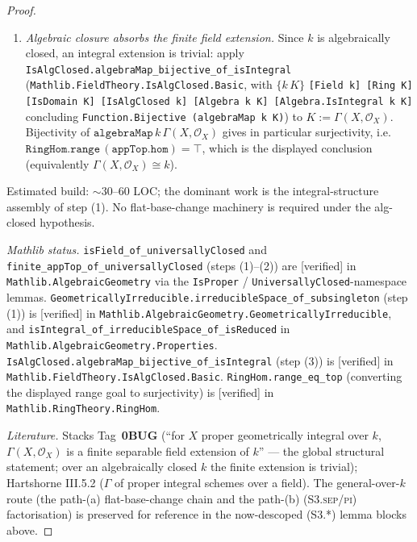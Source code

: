 \begin{proof}
\begin{enumerate}
    \item[(3)] \emph{Algebraic closure absorbs the finite field extension.} Since \(k\) is algebraically closed, an integral extension is trivial: apply \texttt{IsAlgClosed.algebraMap\_bijective\_of\_isIntegral} (\texttt{Mathlib.FieldTheory.IsAlgClosed.Basic}, with \(\{k\,K\}\) \texttt{[Field k] [Ring K] [IsDomain K] [IsAlgClosed k] [Algebra k K] [Algebra.IsIntegral k K]} concluding \texttt{Function.Bijective (algebraMap k K)}) to \(K := \Gamma(X, \mathcal O_X)\). Bijectivity of \(\mathtt{algebraMap}\,k\,\Gamma(X, \mathcal O_X)\) gives in particular surjectivity, i.e.\ \(\mathtt{RingHom.range}\,(\mathtt{appTop.hom}) = \top\), which is the displayed conclusion (equivalently \(\Gamma(X, \mathcal O_X) \cong k\)).
  \end{enumerate}
  Estimated build: \(\sim 30\)--\(60\) LOC; the dominant work is the integral-structure assembly of step (1). No flat-base-change machinery is required under the alg-closed hypothesis.

  \emph{Mathlib status.} \texttt{isField\_of\_universallyClosed} and \texttt{finite\_appTop\_of\_universallyClosed} (steps (1)--(2)) are [verified] in \texttt{Mathlib.AlgebraicGeometry} via the \texttt{IsProper} / \texttt{UniversallyClosed}-namespace lemmas. \texttt{GeometricallyIrreducible.irreducibleSpace\_of\_subsingleton} (step (1)) is [verified] in \texttt{Mathlib.AlgebraicGeometry.GeometricallyIrreducible}, and \texttt{isIntegral\_of\_irreducibleSpace\_of\_isReduced} in \texttt{Mathlib.AlgebraicGeometry.Properties}. \texttt{IsAlgClosed.algebraMap\_bijective\_of\_isIntegral} (step (3)) is [verified] in \texttt{Mathlib.FieldTheory.IsAlgClosed.Basic}. \texttt{RingHom.range\_eq\_top} (converting the displayed range goal to surjectivity) is [verified] in \texttt{Mathlib.RingTheory.RingHom}.

  \emph{Literature.} Stacks Tag~\textbf{0BUG} (``for \(X\) proper geometrically integral over \(k\), \(\Gamma(X, \mathcal O_X)\) is a finite separable field extension of \(k\)'' --- the global structural statement; over an algebraically closed \(k\) the finite extension is trivial); Hartshorne III.5.2 (\(\Gamma\) of proper integral schemes over a field). The general-over-\(k\) route (the path-(a) flat-base-change chain and the path-(b) (S3.\textsc{sep}/\textsc{pi}) factorisation) is preserved for reference in the now-descoped (S3.*) lemma blocks above.
\end{proof}

